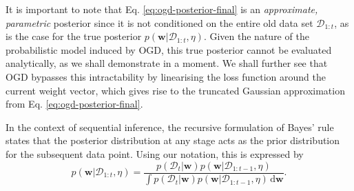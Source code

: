 It is important to note that Eq. \eqref{eq:ogd-posterior-final} is an \emph{approximate, parametric} posterior since it is not conditioned on the entire old data set $\mathcal{D}_{1:t}$, as is the case for the true posterior $p(\mathbf{w}|\mathcal{D}_{1:t}, \eta)$. Given the nature of the probabilistic model induced by OGD, this true posterior cannot be evaluated analytically, as we shall demonstrate in a moment. We shall further see that OGD bypasses this intractability by linearising the loss function around the current weight vector, which gives rise to the truncated Gaussian approximation from Eq. \eqref{eq:ogd-posterior-final}.

In the context of sequential inference, the recursive formulation of Bayes' rule states that the posterior distribution at any stage acts as the prior distribution for the subsequent data point. Using our notation, this is expressed by
\begin{equation}
\label{eq:odg-streaming-bayes-rule}
	p(\mathbf{w}|\mathcal{D}_{1:t}, \eta)
	= \frac{p(\mathcal{D}_{t}|\mathbf{w})p(\mathbf{w}|\mathcal{D}_{1:t-1}, \eta)}{\int p(\mathcal{D}_{t}|\mathbf{w})p(\mathbf{w}|\mathcal{D}_{1:t-1}, \eta) \, \mathrm{d}\mathbf{w}}.
\end{equation}
